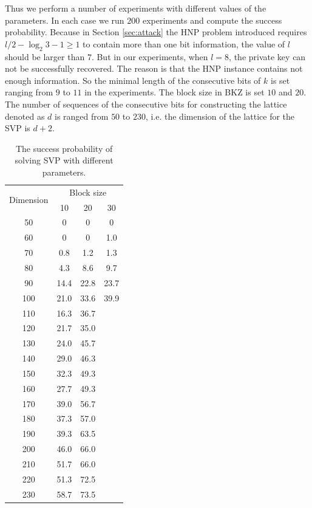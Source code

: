 Thus we perform a number of experiments with different values of the parameters.
 In each case we run $200$ experiments and compute the success probability.
Because in Section \ref{sec:attack} the HNP problem introduced requires $l/2 - \log_{2}{3} -1 \geq 1$ to contain more than one bit information, the value of $l$ should be larger than $7$.
 But in our experiments, when $l = 8$, the private key can not be successfully recovered.
  The reason is that the HNP instance contains not enough information.
So the minimal length of the consecutive bits of $k$ is set ranging from $9$ to $11$ in the experiments.
The block size in BKZ is set $10$  and $20$.
The number of sequences of the consecutive bits for constructing the lattice denoted as $d$ is ranged from $50$ to $230$,
i.e. the dimension of the lattice for the SVP is $d + 2$.

\begin{table}[t]
  \centering
  \caption{The success probability of solving SVP with different parameters.}
  \label{svp9}
    \begin{tabular}{|c|c|c|c|}
    \hline
    \multirow{2}{*}{Dimension}&
    \multicolumn{3}{c|}{Block size} \\%
    \cline{2-4}
    & 10 & 20 & 30\\
  \hline
  50 & 0 & 0 & 0 \\
  \hline
  60 & 0 & 0 & 1.0 \\
  \hline
  70 & 0.8 & 1.2  & 1.3 \\
  \hline
  80 & 4.3 & 8.6 &  9.7 \\
  \hline
  90 & 14.4 & 22.8 & 23.7 \\
  \hline
  100 & 21.0 & 33.6 & 39.9 \\
  \hline
  110 & 16.3 & 36.7 &  \\
  \hline
  120 & 21.7 & 35.0 &  \\
  \hline
  130 & 24.0 & 45.7 &  \\
  \hline
  140 & 29.0 & 46.3 &  \\
  \hline
  150 & 32.3 & 49.3 &  \\
  \hline
  160 & 27.7 & 49.3 &  \\
  \hline
  170 & 39.0 & 56.7 &  \\
  \hline
  180 & 37.3 & 57.0 &  \\
  \hline
  190 & 39.3 & 63.5 &  \\
  \hline
  200 & 46.0 & 66.0 &  \\
  \hline
  210 & 51.7 & 66.0 &  \\
  \hline
  220 & 51.3 & 72.5 &  \\
  \hline
  230 & 58.7 & 73.5 &  \\
  \hline
    \end{tabular}
\end{table}

